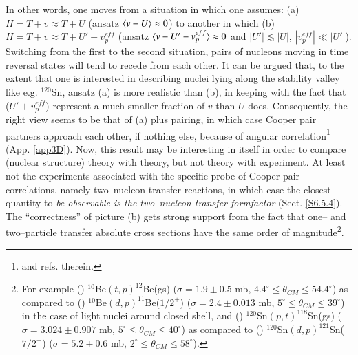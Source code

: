 In other words, one moves from a situation in which one assumes: (a)$H=T+v\approx T+U$ (ansatz $\langle {v-U} \rangle\approx 0$) to another in which (b) $H=T+v\approx T+U'+v_p^{eff}$ (ansatz $\langle {v-U'-v_p^{eff}} \rangle\approx 0$ and $|U'|\lesssim|U|$, $|v_p^{eff}|\ll|U'|$). Switching from the first to the second situation, pairs of nucleons moving in time reversal states will tend to recede from each other. It can be argued that, to the extent that one is interested in describing  nuclei lying along the stability valley like e.g. $^{120}$Sn, ansatz (a) is more realistic  than (b), in keeping with the fact that ($U'+v_p^{eff}$) represent a much smaller fraction of $v$ than $U$ does. Consequently, the right view seems to be that of (a) plus pairing, in which case Cooper pair partners approach each other, if nothing else, because of angular correlation\footnote{\cite{Bertsch:67,Ferreira:84,Matsuo:13} and refs. therein.} (App. \ref{app3D}). Now, this result may be interesting in itself in order  to compare (nuclear structure) theory with theory, but not theory with experiment. At least not the experiments associated with the specific probe of Cooper pair correlations, namely two--nucleon transfer reactions, in which case the closest quantity to \textit{be observable is the two--nucleon transfer formfactor} (Sect. \ref{S6.5.4}).
 The ``correctness'' of picture (b) gets strong support from  the fact that one-- and two--particle transfer  absolute cross sections have the same order of magnitude\footnote{For example (\cite{Fortune:94}) $^{10}$Be$(t,p)^{12}$Be(gs) ($\sigma=1.9\pm0.5$ mb, $4.4^\circ\leq\theta_{CM}\leq 54.4^\circ$) as compared to (\cite{Schmitt:13}) $^{10}$Be$(d,p)^{11}$Be($1/2^+$) ($\sigma=2.4\pm 0.013$ mb, $5^\circ\leq\theta_{CM}\leq 39^\circ$) in the case of light nuclei around closed shell, and (\cite{Bassani:65}) $^{120}$Sn$(p,t)^{118}$Sn(gs) ($\sigma=3.024\pm0.907$ mb, $5^\circ\leq\theta_{CM}\leq 40^\circ$) as compared to (\cite{Bechara:75}) $^{120}$Sn$(d,p)^{121}$Sn($7/2^+$) ($\sigma=5.2\pm0.6$ mb, $2^\circ\leq\theta_{CM}\leq 58^\circ$).}. 


